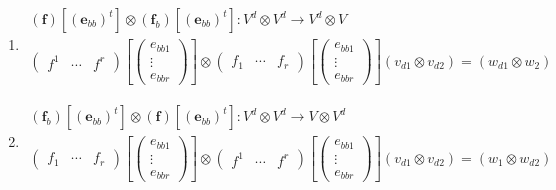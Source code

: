 \documentclass[aps,preprint]{revtex4}
\begin{document}
\begin{enumerate}
\begin{enumerate}
\item 
\begin{gather}
\left( \boldsymbol{f}\right) \left[ \left( \mathbf{e}_{bb}\right) ^{t}\right]
\otimes \left( \boldsymbol{f}_{b}\right) \left[ \left( \mathbf{e}%
_{bb}\right) ^{t}\right] :V^{d}\otimes V^{d}\rightarrow V^{d}\otimes V \\
\left( 
\begin{array}{ccc}
f^{1} & \cdots & f^{r}%
\end{array}%
\right) \left[ \left( 
\begin{array}{c}
e_{bb1} \\ 
\vdots \\ 
e_{bbr}%
\end{array}%
\right) \right] \otimes \left( 
\begin{array}{ccc}
f_{1} & \cdots & f_{r}%
\end{array}%
\right) \left[ \left( 
\begin{array}{c}
e_{bb1} \\ 
\vdots \\ 
e_{bbr}%
\end{array}%
\right) \right] \left( v_{d1}\otimes v_{d2}\right) =\left( w_{d1}\otimes
w_{2}\right)
\end{gather}

\item 
\begin{gather}
\left( \boldsymbol{f}_{b}\right) \left[ \left( \mathbf{e}_{bb}\right) ^{t}%
\right] \otimes \left( \boldsymbol{f}\right) \left[ \left( \mathbf{e}%
_{bb}\right) ^{t}\right] :V^{d}\otimes V^{d}\rightarrow V\otimes V^{d} \\
\left( 
\begin{array}{ccc}
f_{1} & \cdots & f_{r}%
\end{array}%
\right) \left[ \left( 
\begin{array}{c}
e_{bb1} \\ 
\vdots \\ 
e_{bbr}%
\end{array}%
\right) \right] \otimes \left( 
\begin{array}{ccc}
f^{1} & \cdots & f^{r}%
\end{array}%
\right) \left[ \left( 
\begin{array}{c}
e_{bb1} \\ 
\vdots \\ 
e_{bbr}%
\end{array}%
\right) \right] \left( v_{d1}\otimes v_{d2}\right) =\left( w_{1}\otimes
w_{d2}\right)
\end{gather}


\end{enumerate}
\end{enumerate}
\end{document}
